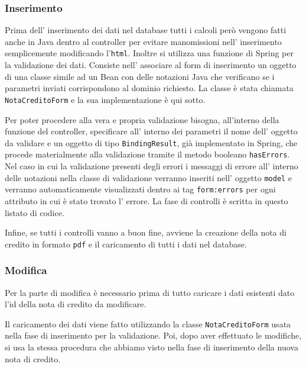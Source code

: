 \documentclass[12pt]{book}
\begin{document}
\subsubsection{Inserimento}
Prima dell' inserimento dei dati nel database tutti i calcoli però vengono 
fatti anche in Java dentro al controller per evitare manomissioni 
nell' inserimento semplicemente modificando l'\texttt{html}.
Inoltre si utilizza una funzione di Spring per la validazione dei dati.
Consiste nell' associare al form di inserimento un oggetto di una classe simile
ad un Bean con delle notazioni Java che verificano se i parametri inviati 
corrispondono al dominio richiesto. La classe è stata chiamata 
\texttt{NotaCreditoForm} e la sua implementazione è qui sotto.

Per poter procedere alla vera e propria validazione bisogna, all'interno della
funzione del controller, specificare all' interno dei 
parametri il nome dell' oggetto da validare e un oggetto di tipo 
\texttt{BindingResult}, già implementato in Spring, che procede materialmente 
alla validazione tramite il metodo booleano \texttt{hasErrors}.
Nel caso in cui la validazione presenti degli errori i messaggi di errore 
all' interno delle notazioni nella classe di validazione verranno inseriti 
nell' oggetto \texttt{model} e verranno automaticamente visualizzati dentro 
ai tag \texttt{form:errors} per ogni attributo in cui è stato trovato l' errore.
La fase di controlli è scritta in questo listato di codice.

Infine, se tutti i controlli vanno a buon fine, avviene la creazione della nota di 
credito in formato \texttt{pdf} e il caricamento di tutti i dati nel database.

\subsubsection{Modifica}
Per la parte di modifica è necessario prima di tutto caricare i dati esistenti
dato l'id della nota di credito da modificare.

Il caricamento dei dati viene fatto utilizzando la classe 
\texttt{NotaCreditoForm} usata nella fase di inserimento per la validazione.
Poi, dopo aver effettuato le modifiche, si usa la stessa procedura che abbiamo
visto nella fase di inserimento della nuova nota di credito.
\end{document}

